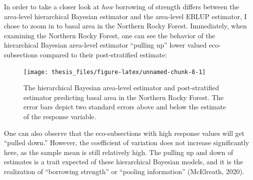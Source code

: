 \documentclass[12pt,twoside]{reedthesis}
\begin{document}
In order to take a closer look at \emph{how} borrowing of strength differs between the area-level hierarchical Bayesian estimator and the area-level EBLUP estimator, I chose to zoom in to basal area in the Northern Rocky Forest. Immediately, when examining the Northern Rocky Forest, one can see the behavior of the hierarchical Bayesian area-level estimator ``pulling up'' lower valued eco-subsections compared to their post-stratified estimate:
\begin{figure}

{\centering \texttt{[image: thesis\_files/figure-latex/unnamed-chunk-8-1]} 

}

\caption[HB Area and Post-stratified estimates in M333]{The hierarchical Bayesian area-level estimator and post-stratified estimator predicting basal area in the Northern Rocky Forest. The error bars depict two standard errors above and below the estimate of the response variable.}\label{fig:unnamed-chunk-8}
\end{figure}
One can also observe that the eco-subsections with high response values will get ``pulled down.'' However, the coefficient of variation does not increase significantly here, as the sample mean is still relatively high. The pulling up and down of estimates is a trait expected of these hierarchical Bayesian models, and it is the realization of ``borrowing strength'' or ``pooling information'' (McElreath, 2020).
\end{document}
